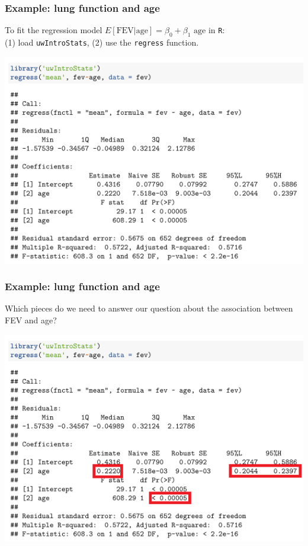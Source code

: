 \documentclass[12pt, 
hyperref={colorlinks=true, linkcolor=blue, urlcolor=cyan},dvipsnames]{beamer}
\begin{document}
\begin{frame}
\frametitle{Example: lung function and age}
To fit the regression model \color{blue} $E[\text{FEV}|\text{age}] = \beta_0 + \beta_1 \text{ age}$ \color{black} in \texttt{R}:\\ (1) load \texttt{uwIntroStats}, (2) use the \texttt{regress} function. \vspace{-0.3cm}

\center
\includegraphics[width=0.55\paperwidth]{./plots/regress_fev_vs_age}
\end{frame}

\begin{frame}
\frametitle{Example: lung function and age}
Which pieces do we need to answer our question about the association between FEV and age? \vspace{-0.3cm}

\center
\includegraphics[width=0.55\paperwidth]{./plots/regress_fev_vs_age_highlights}
\end{frame}
\end{document}
